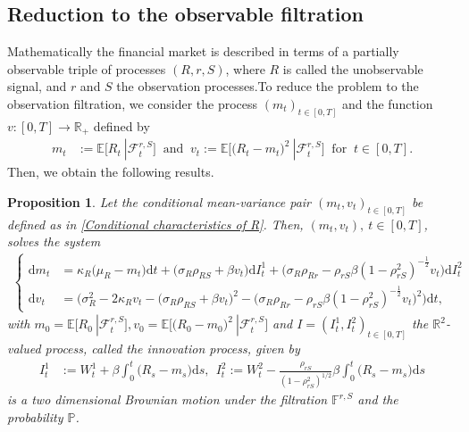 \documentclass[12,reqno]{amsart}
\numberwithin{equation}{section}
\newtheorem{prop}[defi]{Proposition}
\begin{document}
\subsection{Reduction to the observable filtration}\label{Reduction to the observable filtration}
Mathematically the financial market is described in terms of a partially observable triple of processes $(R,r,S)$, where $R$ is called the unobservable signal, and $r$ and $S$ the observation processes.To reduce the problem to the observation filtration, we consider the process $(m_{t})_{t\in[0,T]}$ and the function $v:[0,T]\to\mathbb{R}_{+}$ defined by
\begin{align}\label{Conditional characteristics of R}
	m_{t}&:=\mathbb{E}\big[R_{t}~|\mathcal{F}_{t}^{r,S}\big]~\text{ and }~v_{t}:=\mathbb{E}\big[\big(R_{t}-m_{t}\big)^{2}~|\mathcal{F}_{t}^{r,S}\big]~\text{ for }~t\in[0,T].
\end{align}
Then, we obtain the following results.
\begin{prop}\label{Conditional mean-variance pair}
	Let the conditional mean-variance pair $(m_{t},v_{t})_{t\in[0,T]}$ be defined as in \eqref{Conditional characteristics of R}. Then, $(m_{t},v_{t}),~t\in[0,T]$, solves the system
	\begin{align*}
		\begin{cases}
			\mathrm{d}m_{t}&=\kappa_{R}\big(\mu_{R}-m_{t}\big)\mathrm{d}t+\big(\sigma_{R}\rho_{RS}+\beta v_{t}\big)\mathrm{d}I_{t}^{1}+\big(\sigma_{R}\rho_{Rr} -\rho_{rS}\beta(1-\rho_{rS}^{2})^{-\frac{1}{2}}v_{t}\big)\mathrm{d}I_{t}^{2}\\
			\mathrm{d}v_{t}&=\Big(\sigma_{R}^{2}-2\kappa_{R}v_{t}-\big(\sigma_{R}\rho_{RS}+\beta v_{t}\big)^{2}-\big(\sigma_{R}\rho_{Rr} -\rho_{rS}\beta(1-\rho_{rS}^{2})^{-\frac{1}{2}}v_{t}\big)^{2}\Big)\mathrm{d}t,
		\end{cases}
	\end{align*}
	with $m_{0}=\mathbb{E}\big[R_{0}~|\mathcal{F}_{t}^{r,S}\big],v_{0}=\mathbb{E}\big[\big(R_{0}-m_{0}\big)^{2}~|\mathcal{F}_{t}^{r,S}\big]$ and $I=(I_{t}^{1},I_{t}^{2})_{t\in[0,T]}$ the $\mathbb{R}^{2}$-valued process, called the \textit{innovation process}, given by
	\begin{align}\label{Innovation process}
		I_{t}^{1}&:=W_{t}^{1}+\beta\int_{0}^{t}\big(R_{s}-m_{s}\big)\mathrm{d}s,~~I_{t}^{2}:=W_{t}^{2}-\frac{\rho_{rS}}{(1-\rho_{rS}^{2})^{1/2}}\beta\int_{0}^{t}\big(R_{s}-m_{s}\big)\mathrm{d}s
	\end{align}
	is a two dimensional Brownian motion under the filtration $\mathbb{F}^{r,S}$ and the probability $\mathbb{P}$.
\end{prop}
\end{document}
